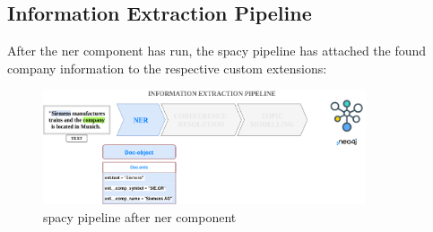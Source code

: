 \subsection{Information Extraction Pipeline}
After the \gls{ner} component has run, the spacy pipeline has attached the found company information to the respective custom extensions:
\begin{figure}[H]   %
    \centering
    \includegraphics[width=0.85\textwidth]{Assets/pipelineNER}
    \caption{spacy pipeline after \gls{ner} component}
    \label{fig:pipeNER}
\end{figure}
